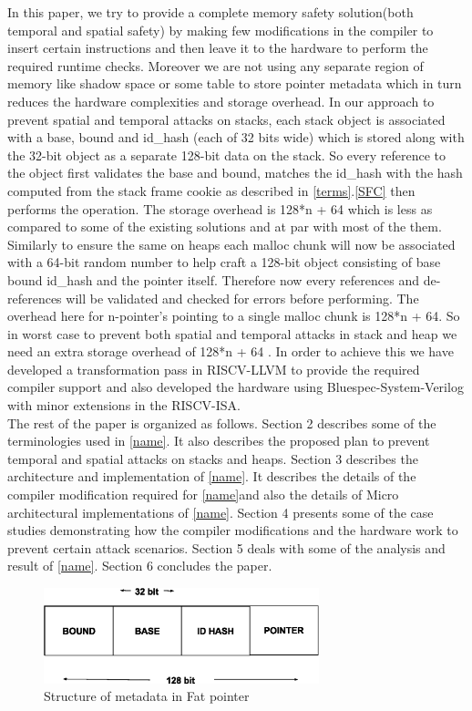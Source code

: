In this paper, we try to provide a complete memory safety solution(both temporal and spatial safety) by making few modifications in the compiler to insert certain instructions and then leave it to the hardware to perform the required runtime checks. Moreover we are not using any separate region of memory like shadow space or some table to store pointer metadata which in turn reduces the hardware complexities and storage overhead. In our approach to prevent spatial and temporal attacks on stacks, each stack object is associated with a base, bound and id\_hash (each of 32 bits wide) which is stored along with the 32-bit object as a separate 128-bit data on the stack. So every reference to the object first validates the base and bound, matches the id\_hash with the hash computed from the stack frame cookie as described in \ref{terms}.\ref{SFC} then performs the operation.  The storage overhead is 128*n + 64 which is less as compared to some of the existing solutions and at par with most of the them. Similarly to ensure the same on heaps each malloc chunk will now be associated with a 64-bit random number to help craft a 128-bit object consisting of base bound id\_hash and the pointer itself. Therefore now every references and de-references will be validated and checked for errors before performing. The overhead here for n-pointer's pointing to a single malloc chunk is 128*n + 64. So in worst case to prevent both spatial and temporal attacks in stack and heap we need an extra storage overhead of 128*n + 64 . In order to achieve this we have developed a transformation pass in RISCV-LLVM to provide the required compiler support and also  developed the hardware using Bluespec-System-Verilog\cite{Bluespec} with minor extensions in the RISCV-ISA.\\

The rest of the paper is organized as follows. Section 2 describes some of the terminologies used in \ref{name}. It also describes the proposed plan to prevent temporal and spatial attacks on stacks and heaps. Section 3 describes the architecture and implementation of \ref{name}. It describes the details of the compiler modification required for \ref{name}and also the details of Micro architectural implementations of \ref{name}. Section 4 presents some of the case studies demonstrating how the compiler modifications and the hardware work to prevent certain attack scenarios. Section 5 deals with some of the analysis and  result of \ref{name}. Section 6 concludes the paper.

\begin{figure}
\centering
\captionsetup{justification=centering}
\includegraphics[width=8cm]{fat_pointer.eps}
\caption{Structure of metadata in Fat pointer}
\label{fig: metadata}
\hrulefill
\end{figure}

